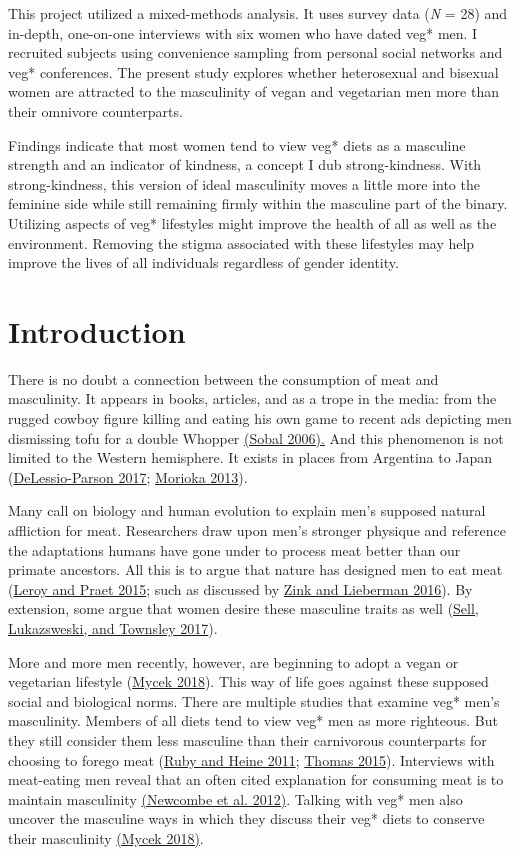 \documentclass[twoside]{report}
\let\oldsection\section
\renewcommand\section{\clearpage\oldsection}
\begin{document}
This project utilized a mixed-methods analysis. It uses survey data (\emph{N}
= 28) and in-depth, one-on-one interviews with six women who have dated
veg* men. I recruited subjects using convenience sampling from personal
social networks and veg* conferences. The present study explores whether
heterosexual and bisexual women are attracted to the masculinity of
vegan and vegetarian men more than their omnivore counterparts. 

Findings indicate that most women tend to view veg* diets as a masculine
strength and an indicator of kindness, a concept I dub strong-kindness.
With strong-kindness, this version of ideal masculinity moves a little
more into the feminine side while still remaining firmly within the
masculine part of the binary. Utilizing aspects of veg* lifestyles might
improve the health of all as well as the environment. Removing the
stigma associated with these lifestyles may help improve the lives of
all individuals regardless of gender identity.
\raggedbottom
\pagebreak
\section{Introduction}

There is no doubt a connection between the consumption of meat and
masculinity. It appears in books, articles, and as a trope in the media:
from the rugged cowboy figure killing and eating his own game to recent
ads depicting men dismissing tofu for a double Whopper \hyperlink{sobal}{(Sobal 2006).}
And this phenomenon is not limited to the Western hemisphere. It exists
in places from Argentina to Japan (\hyperlink{delessio-parson}{DeLessio-Parson 2017}; \hyperlink{morioka}{Morioka 2013}).

Many call on biology and human evolution to explain men's supposed
natural affliction for meat. Researchers draw upon men's stronger
physique and reference the adaptations humans have gone under to process
meat better than our primate ancestors. All this is to argue that nature
has designed men to eat meat (\hyperlink{leroy}{Leroy and Praet 2015}; such as discussed by \hyperlink{zink}{Zink and Lieberman 2016}). By
extension, some argue that women desire these masculine traits as well
(\hyperlink{sell}{Sell, Lukazsweski, and Townsley 2017}).

More and more men recently, however, are beginning to adopt a vegan or
vegetarian lifestyle (\hyperlink{mycek}{Mycek 2018}). This way of life goes against these supposed social and biological norms. There are multiple studies that examine veg* men's masculinity. Members of all diets tend to view veg*
men as more righteous. But they still consider them less masculine than
their carnivorous counterparts for choosing to forego meat (\hyperlink{ruby}{Ruby and
Heine 2011}; \hyperlink{thomas}{Thomas 2015}). Interviews with meat-eating men reveal that an often cited explanation for consuming meat is to maintain masculinity \hyperlink{newcombe}{(Newcombe et al. 2012)}. Talking with veg* men also uncover the masculine ways in which they discuss their veg* diets to conserve their masculinity \hyperlink{mycek}{(Mycek 2018)}.
\end{document}
